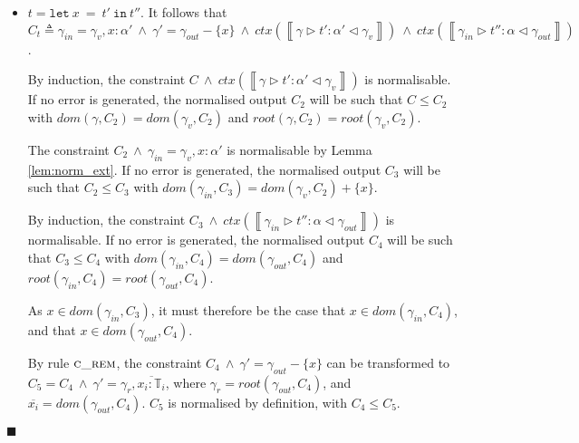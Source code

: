 \documentclass[preprint]{sigplanconf}
\newcommand{\lemref}[1]{Lemma \ref{#1}}
\newcommand{\inferrule}[4]{\left\llbracket #1 \triangleright #2 : #3 \triangleleft #4 \right\rrbracket}
\newcommand{\lett}[3]{\mathtt{let}\:#1\:\mathtt{=}\:#2\:\mathtt{in}\:#3}
\newcommand{\cand}{\:\wedge\:}
\newcommand{\tinf}{\mathbb{T}}
\newcommand{\qed}{$\blacksquare$}
\newenvironment{proof}{\vspace{1ex}\noindent{\bf Proof}\hspace{0.5em}}
  {\hfill\qed\vspace{1ex}}
\begin{document}
\begin{proof}
\begin{itemize}
Let $C_3$ be the constraint 
$C_2 \cand \gamma_r = \emptyset \cand \gamma_{in} = \gamma_r, \overline{x_i : \alpha_i}$.
$C_3$ is normalised by definition, with $C_2 \leq C_3$.

The constraint $C_3 \cand \inferrule{\gamma_{in}}{t'}{\alpha}{\gamma_{out}}$
is normalisable by induction. Let $C_4$ be the normalised output, where
$C_3 \leq C_4$.

Let $C_5$ be the constraint 
$C_4 \cand \overline{x_i : \alpha_i' \in \gamma_out}$.
This constraint is normalisable by repeated application of 
\lemref{lem:norm_usage}. If no error is generated, the normalised constraint 
$C_5$ will be produced, where $C_4 \leq C_5$.

Transitively, $C \leq C_5$. It is also the case that $C_2 \leq C_5$, therefore 
$dom(\gamma, C_5) = dom(\gamma', C_5)$ and
$root(\gamma, C_5) = root(\gamma', C_5)$.

\item $t = \lett{x}{t'}{t''}$.
It follows that 
$C_t \triangleq \gamma_{in} = \gamma_v, x : \alpha' \cand 
\gamma' = \gamma_{out} - \{x\} \cand
ctx(\inferrule{\gamma}{t'}{\alpha'}{\gamma_v}) \cand
ctx(\inferrule{\gamma_{in}}{t''}{\alpha}{\gamma_{out}})$.

By induction, the constraint 
$C \cand ctx(\inferrule{\gamma}{t'}{\alpha'}{\gamma_v})$ is normalisable.
If no error is generated, the normalised output $C_2$ will be such that
$C \leq C_2$ with $dom(\gamma, C_2) = dom(\gamma_v, C_2)$ and
$root(\gamma, C_2) = root(\gamma_v, C_2)$.

The constraint $C_2 \cand \gamma_{in} = \gamma_v, x : \alpha'$ is
normalisable by \lemref{lem:norm_ext}. If no error is generated, the
normalised output $C_3$ will be such that $C_2 \leq C_3$ with 
$dom(\gamma_{in}, C_3) = dom(\gamma_v, C_2) + \{ x \}$.

By induction, the constraint
$C_3 \cand ctx(\inferrule{\gamma_{in}}{t''}{\alpha}{\gamma_{out}})$
is normalisable. If no error is generated, the normalised output $C_4$
will be such that
$C_3 \leq C_4$ with $dom(\gamma_{in}, C_4) = dom(\gamma_{out}, C_4)$
and $root(\gamma_{in}, C_4) = root(\gamma_{out}, C_4)$.

As $x \in dom(\gamma_{in}, C_3)$, it must therefore be the case that
$x \in dom(\gamma_{in}, C_4)$, and that $x \in dom(\gamma_{out}, C_4)$.

By rule $\textsc{c\_rem}$, the constraint
$C_4 \cand \gamma' = \gamma_{out} - \{ x \}$ can be transformed
to $C_5 = C_4 \cand \gamma' = \gamma_r, \overline{x_i : \tinf_i}$, where
$\gamma_r = root(\gamma_{out}, C_4)$, and 
$\overline{x_i} = dom(\gamma_{out}, C_4)$. $C_5$ is normalised by definition,
with $C_4 \leq C_5$.


\end{itemize}
\end{proof}
\end{document}
